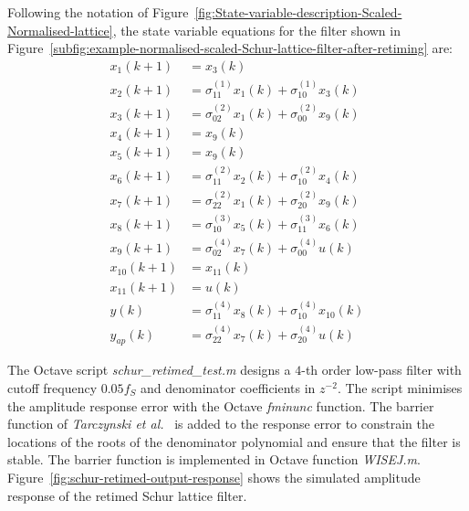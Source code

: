 \documentclass[a4paper,twoside,10pt,english]{report}
\begin{document}
Following the notation of 
Figure~\ref{fig:State-variable-description-Scaled-Normalised-lattice}, the state 
variable equations for the filter shown in 
Figure~\ref{subfig:example-normalised-scaled-Schur-lattice-filter-after-retiming}
are:
\begin{align*}
x_{1}\left(k+1\right)  &= x_{3}\left(k\right) \\
x_{2}\left(k+1\right)  &= \sigma_{11}^{\left(1\right)}x_{1}\left(k\right) +
                         \sigma_{10}^{\left(1\right)}x_{3}\left(k\right) \\
x_{3}\left(k+1\right)  &= \sigma_{02}^{\left(2\right)}x_{1}\left(k\right) + 
                        \sigma_{00}^{\left(2\right)}x_{9}\left(k\right) \\
x_{4}\left(k+1\right)  &= x_{9}\left(k\right) \\
x_{5}\left(k+1\right)  &= x_{9}\left(k\right) \\
x_{6}\left(k+1\right)  &= \sigma_{11}^{\left(2\right)}x_{2}\left(k\right) +
                         \sigma_{10}^{\left(2\right)}x_{4}\left(k\right) \\
x_{7}\left(k+1\right)  &= \sigma_{22}^{\left(2\right)}x_{1}\left(k\right) +
                        \sigma_{20}^{\left(2\right)}x_{9}\left(k\right) \\
x_{8}\left(k+1\right)  &= \sigma_{10}^{\left(3\right)}x_{5}\left(k\right) +
                        \sigma_{11}^{\left(3\right)}x_{6}\left(k\right) \\
x_{9}\left(k+1\right)  &= \sigma_{02}^{\left(4\right)}x_{7}\left(k\right) + 
                        \sigma_{00}^{\left(4\right)}u\left(k\right) \\
x_{10}\left(k+1\right) &= x_{11}\left(k\right) \\
x_{11}\left(k+1\right) &= u\left(k\right) \\
y\left(k\right)       & = \sigma_{11}^{\left(4\right)}x_{8}\left(k\right) +
                          \sigma_{10}^{\left(4\right)}x_{10}\left(k\right) \\
y_{ap}\left(k\right)   &= \sigma_{22}^{\left(4\right)}x_{7}\left(k\right) +
                         \sigma_{20}^{\left(4\right)}u\left(k\right)
\end{align*}

The Octave script \emph{schur\_retimed\_test.m} designs a $4$-th order low-pass
filter with cutoff frequency $0.05f_{S}$ and denominator coefficients in
$z^{-2}$. The script minimises the amplitude response error with the Octave
\emph{fminunc} function. The barrier function of \emph{Tarczynski et
al.}~\cite{TarczynskiCainHermanowiczRojewski_WISEMethodDesignIIRFilters} is 
added to the response error to constrain the locations of the roots of the 
denominator polynomial and ensure that the filter is stable. The barrier 
function is implemented in Octave function \emph{WISEJ.m}. 
Figure~\ref{fig:schur-retimed-output-response} shows the simulated amplitude 
response of the retimed Schur lattice filter.
\end{document}
